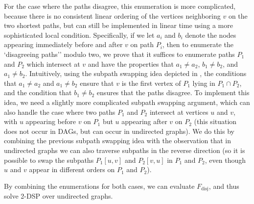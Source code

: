 \documentclass[11pt]{article}
\DeclareMathOperator{\disj}{disj}
\theoremstyle{definition}
\begin{document}
For the case where the paths disagree, this enumeration is  more complicated, because there is no consistent linear ordering of the vertices neighboring $v$ on the two shortest paths, but can still be implemented in linear time using a more sophisticated local condition.
Specifically, if we let $a_i$ and $b_i$ denote the nodes appearing immediately before and after $v$ on path $P_i$, then to enumerate the `disagreeing paths'' modulo two, we prove that it suffices to enumerate paths $P_1$ and $P_2$ which intersect at $v$ and have the properties that $a_1\neq a_2$, $b_1\neq b_2$, and $a_1\neq b_2$.
Intuitively, using the subpath swapping idea depicted in , the conditions that $a_1\neq a_2$ and $a_1\neq b_2$ ensure that $v$ is the first vertex of $P_1$ lying in $P_1\cap P_2$, and the condition that $b_1\neq b_2$  ensures that the paths disagree.
To implement this idea, we need a slightly more complicated subpath swapping argument, which can also handle the case where two paths $P_1$ and $P_2$ intersect at vertices $u$ and $v$, with $u$ appearing before $v$ on $P_1$ but $u$ appearing after $v$ on $P_2$ (this situation does not occur in DAGs, but can occur in undirected graphs).
We do this by combining the previous subpath swapping idea with the observation that in undirected graphs we can also traverse subpaths in the reverse direction (so it is possible to swap the subpaths $P_1[u,v]$ and $P_2[v,u]$ in $P_1$ and $P_2$, even though $u$ and $v$ appear in different orders on $P_1$ and $P_2$).

By combining the enumerations for both cases, we can evaluate $F_{\disj}$, and thus solve \textsf{2-DSP} over undirected graphs.
\end{document}
